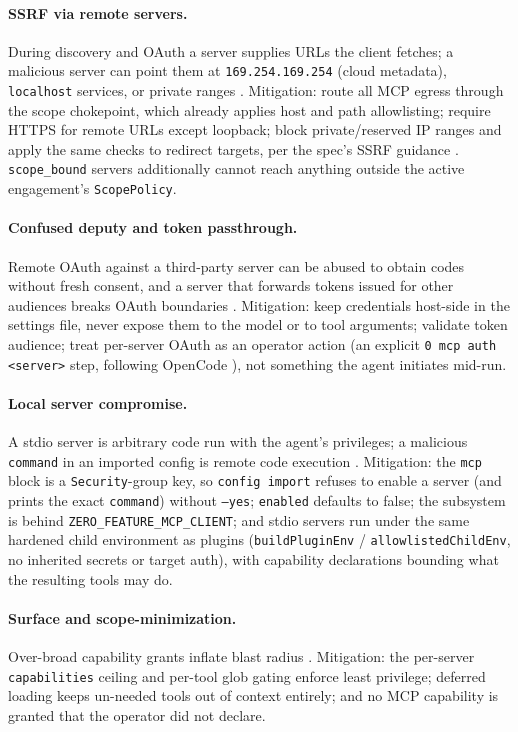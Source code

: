 \documentclass[11pt]{article}
\begin{document}
\paragraph{SSRF via remote servers.} During discovery and OAuth a server
supplies URLs the client fetches; a malicious server can point them at
\texttt{169.254.169.254} (cloud metadata), \texttt{localhost} services, or
private ranges \cite{mcp-security}. Mitigation: route all MCP egress through the
scope chokepoint, which already applies host and path allowlisting; require
HTTPS for remote URLs except loopback; block private/reserved IP ranges and
apply the same checks to redirect targets, per the spec's SSRF guidance
\cite{mcp-security}. \texttt{scope\_bound} servers additionally cannot reach
anything outside the active engagement's \texttt{ScopePolicy}.

\paragraph{Confused deputy and token passthrough.} Remote OAuth against a
third-party server can be abused to obtain codes without fresh consent, and a
server that forwards tokens issued for other audiences breaks OAuth boundaries
\cite{mcp-security}. Mitigation: keep credentials host-side in the settings
file, never expose them to the model or to tool arguments; validate token
audience; treat per-server OAuth as an operator action (an explicit
\texttt{0 mcp auth <server>} step, following OpenCode \cite{opencode-mcp}),
not something the agent initiates mid-run.

\paragraph{Local server compromise.} A stdio server is arbitrary code run with
the agent's privileges; a malicious \texttt{command} in an imported config is
remote code execution \cite{mcp-security}. Mitigation: the \texttt{mcp} block is
a \texttt{Security}-group key, so \texttt{config import} refuses to enable a
server (and prints the exact \texttt{command}) without \texttt{--yes};
\texttt{enabled} defaults to false; the subsystem is behind
\texttt{ZERO\_FEATURE\_MCP\_CLIENT}; and stdio servers run under the same hardened
child environment as plugins (\texttt{buildPluginEnv} / \texttt{allowlistedChildEnv},
no inherited secrets or target auth), with capability declarations bounding what
the resulting tools may do.

\paragraph{Surface and scope-minimization.} Over-broad capability grants inflate
blast radius \cite{mcp-security}. Mitigation: the per-server \texttt{capabilities}
ceiling and per-tool glob gating enforce least privilege; deferred loading keeps
un-needed tools out of context entirely; and no MCP capability is granted that
the operator did not declare.
\end{document}

